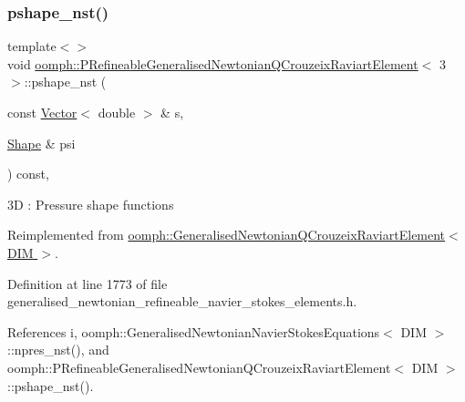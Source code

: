 \subsubsection{\texorpdfstring{pshape\+\_\+nst()}{pshape\_nst()}\hspace{0.1cm}{\footnotesize\ttfamily [5/6]}}
{\footnotesize\ttfamily template$<$$>$ \\
void \hyperlink{classoomph_1_1PRefineableGeneralisedNewtonianQCrouzeixRaviartElement}{oomph\+::\+P\+Refineable\+Generalised\+Newtonian\+Q\+Crouzeix\+Raviart\+Element}$<$ 3 $>$\+::pshape\+\_\+nst (\begin{DoxyParamCaption}\item[{const \hyperlink{classoomph_1_1Vector}{Vector}$<$ double $>$ \&}]{s,  }\item[{\hyperlink{classoomph_1_1Shape}{Shape} \&}]{psi }\end{DoxyParamCaption}) const\hspace{0.3cm}{\ttfamily [inline]}, {\ttfamily [virtual]}}

3D \+: Pressure shape functions 

Reimplemented from \hyperlink{classoomph_1_1GeneralisedNewtonianQCrouzeixRaviartElement_ac67f51cf0d592e011ea165f62ff8976e}{oomph\+::\+Generalised\+Newtonian\+Q\+Crouzeix\+Raviart\+Element$<$ D\+I\+M $>$}.



Definition at line 1773 of file generalised\+\_\+newtonian\+\_\+refineable\+\_\+navier\+\_\+stokes\+\_\+elements.\+h.



References i, oomph\+::\+Generalised\+Newtonian\+Navier\+Stokes\+Equations$<$ D\+I\+M $>$\+::npres\+\_\+nst(), and oomph\+::\+P\+Refineable\+Generalised\+Newtonian\+Q\+Crouzeix\+Raviart\+Element$<$ D\+I\+M $>$\+::pshape\+\_\+nst().

\mbox{\label{classoomph_1_1PRefineableGeneralisedNewtonianQCrouzeixRaviartElement_a6774455a8d434b26b49c0a4957afa604}} 
